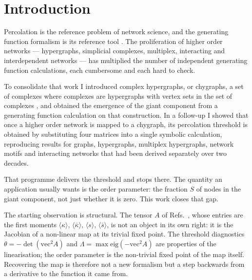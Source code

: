 \documentclass[aps,pre,twocolumn,superscriptaddress,floatfix,longbibliography]{revtex4-2}
\newcommand{\ave}[1]{\langle #1 \rangle}
\newcommand{\vecA}{\mathrm{vec}^2 A}
\begin{document}
\maketitle

\section{Introduction}

Percolation is the reference problem of network science, and the generating
function formalism is its reference tool \cite{molloy1998,callaway2000}. The
proliferation of higher order networks --- hypergraphs, simplicial complexes,
multiplex, interacting and interdependent networks
\cite{kivela2014,battiston2020,battiston2021,bianconi2021} --- has multiplied
the number of independent generating function calculations, each cumbersome and
each hard to check.

To consolidate that work I introduced complex hypergraphs, or chygraphs, a set
of complexes where complexes are hypergraphs with vertex sets in the set of
complexes \cite{vazquez2023pre}, and obtained the emergence of the giant
component from a generating function calculation on that construction. In a
follow-up \cite{vazquez2024comnet} I showed that once a higher order network is
mapped to a chygraph, its percolation threshold is obtained by substituting four
matrices into a single symbolic calculation, reproducing results for graphs,
hypergraphs, multiplex hypergraphs, network motifs and interacting networks that
had been derived separately over two decades.

That programme delivers the threshold and stops there. The quantity an
application usually wants is the order parameter: the fraction $S$ of nodes in
the giant component, not just whether it is zero. This work closes that gap.

The starting observation is structural. The tensor $A$ of
Refs.~\cite{vazquez2023pre,vazquez2024comnet}, whose entries are the first
moments $\ave{\kappa}$, $\ave{\bar\kappa}$, $\ave{s}$, $\ave{\bar s}$, is not an
object in its own right: it is the Jacobian of a non-linear map at its trivial
fixed point. The threshold diagnostics $\theta=-\det(\vecA)$ and
$\Lambda=\max\mathrm{eig}(-\vecA)$ are properties of the linearisation; the
order parameter is the non-trivial fixed point of the map itself. Recovering the
map is therefore not a new formalism but a step backwards from a derivative to
the function it came from.
\end{document}
